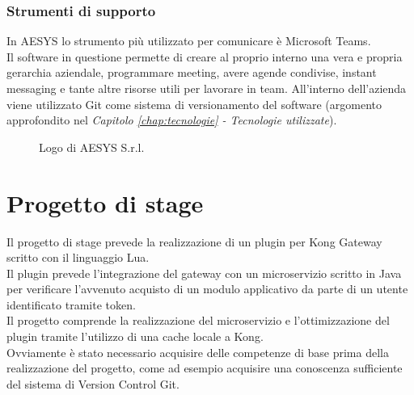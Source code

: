 \subsubsection{Strumenti di supporto}\label{sec:strumentidisupporto}
In AESYS lo strumento più utilizzato per comunicare è Microsoft Teams.\\
Il software in questione permette di creare al proprio interno una vera e propria gerarchia aziendale, programmare meeting, avere agende condivise, instant messaging e tante altre risorse utili per lavorare in team.
All'interno dell'azienda viene utilizzato Git come sistema di versionamento del software (argomento approfondito nel \emph{Capitolo \ref{chap:tecnologie} - Tecnologie utilizzate}).\\

\begin{figure}[ht]
	\centering
	\caption{Logo di AESYS S.r.l.}
	\label{fig:one}
\end{figure}

\section{Progetto di stage}\label{sec:progetto}
Il progetto di stage prevede la realizzazione di un plugin per Kong Gateway scritto con il linguaggio Lua.\\
Il plugin prevede l'integrazione del gateway con un microservizio scritto in Java per verificare l'avvenuto acquisto di un modulo applicativo da parte di un utente identificato tramite token.\\
Il progetto comprende la realizzazione del microservizio e l'ottimizzazione del plugin tramite l'utilizzo di una cache locale a Kong.\\

Ovviamente è stato necessario acquisire delle competenze di base prima della realizzazione del progetto, come ad esempio acquisire una conoscenza sufficiente del sistema di Version Control Git.

